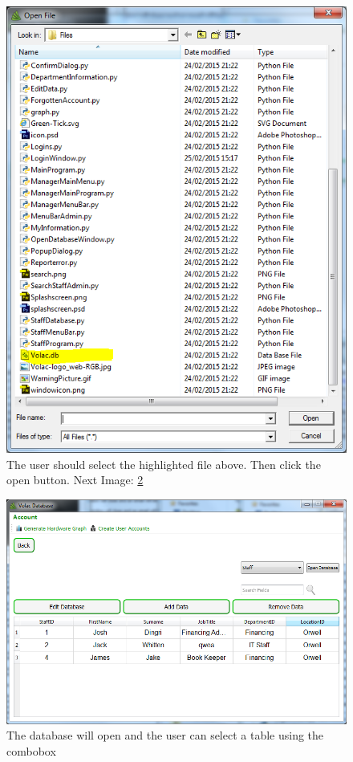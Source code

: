 \begin{figure}[H]
    \includegraphics[width=\textwidth]{./Testing/Images/OpenDatabaseFileBrowser.png}
    \caption{The user should select the highlighted file above. Then click the open button. Next Image: \ref{fig:OpenDatabaseAfterBrowser}} \label{fig:OpenDatabaseFileBrowser}
\end{figure}


\begin{figure}[H]
    \includegraphics[width=\textwidth]{./Testing/Images/OpenDatabaseAfterBrowser.png}
    \caption{The database will open and the user can select a table using the combobox} \label{fig:OpenDatabaseAfterBrowser}
\end{figure}

